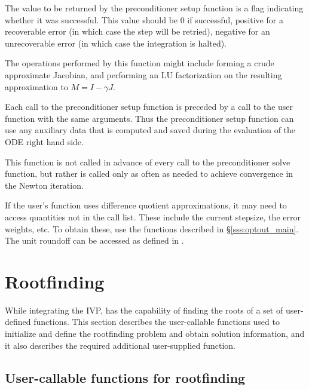 {
  The value to be returned by the preconditioner setup function is a flag
  indicating whether it was successful.  This value should be $0$ if successful, 
  positive for a recoverable error (in which case the step will be retried),     
  negative for an unrecoverable error (in which case the integration is halted). 
}
{
  The operations performed by this function might include forming a crude 
  approximate Jacobian, and performing an LU factorization on the resulting
  approximation to $M=I - \gamma J$.

  Each call to the preconditioner setup function is preceded by a call to     
  the  user function with the same  arguments.  
  Thus the preconditioner setup function can use any auxiliary data that is 
  computed and saved during the evaluation of the ODE right hand side.
  
  This function is not called in advance of every call to the preconditioner
  solve function, but rather is called only as often as needed to achieve
  convergence in the Newton iteration. 

  If the user's  function uses difference quotient
  approximations, it may need to access quantities not in the call
  list. These include the current stepsize, the error weights, etc.
  To obtain these, use the  functions described in
  \S\ref{sss:optout_main}. The unit roundoff can be accessed
  as  defined in .
}

\section{Rootfinding}\label{s:using_rootfinding}

While integrating the IVP, {\cvode} has the capability of finding the
roots of a set of user-defined functions. This section describes the
user-callable functions used to initialize and define the rootfinding
problem and obtain solution information, and it also describes the
required additional user-supplied function.

\subsection{User-callable functions for rootfinding}\label{ss:root_uc}

